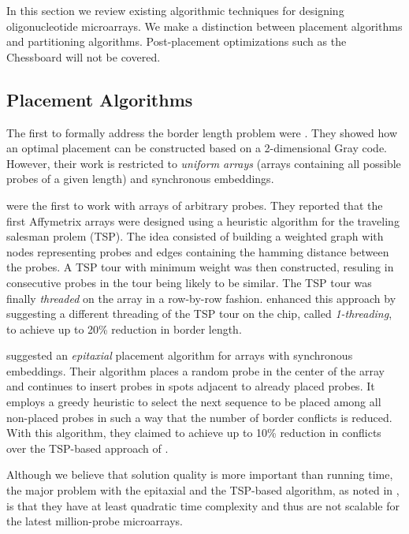 \documentclass{bioinfo}
\begin{document}
In this section we review existing algorithmic techniques for designing oligonucleotide microarrays. We make a distinction between placement algorithms and partitioning algorithms. Post-placement optimizations such as the Chessboard \citep{KAHNG02} will not be covered.

\subsection{Placement Algorithms}

The first to formally address the border length problem were \citealp{FELDMAN93}. They showed how an optimal placement can be constructed based on a 2-dimensional Gray code. However, their work is restricted to \emph{uniform arrays} (arrays containing all possible probes of a given length) and synchronous embeddings.

\citealp{HANNENHALLI02} were the first to work with arrays of arbitrary probes. They reported that the first Affymetrix arrays were designed using a heuristic algorithm for the traveling salesman prolem (TSP). The idea consisted of building a weighted graph with nodes representing probes and edges containing the hamming distance between the probes. A TSP tour with minimum weight was then constructed, resuling in consecutive probes in the tour being likely to be similar. The TSP tour was finally \emph{threaded} on the array in a row-by-row fashion. \citealp{HANNENHALLI02} enhanced this approach by suggesting a different threading of the TSP tour on the chip, called \emph{1-threading}, to achieve up to 20\% reduction in border length.

\citealp{KAHNG02} suggested an \emph{epitaxial} placement algorithm for arrays with synchronous embeddings. Their algorithm places a random probe in the center of the array and continues to insert probes in spots adjacent to already placed probes. It employs a greedy heuristic to select the next sequence to be placed among all non-placed probes in such a way that the number of border conflicts is reduced. With this algorithm, they claimed to achieve up to 10\% reduction in conflicts over the TSP-based approach of \citealp{HANNENHALLI02}.

Although we believe that solution quality is more important than running time, the major problem with the epitaxial and the TSP-based algorithm, as noted in \citealp{KAHNG03_1}, is that they have at least quadratic time complexity and thus are not scalable for the latest million-probe microarrays.
\end{document}
